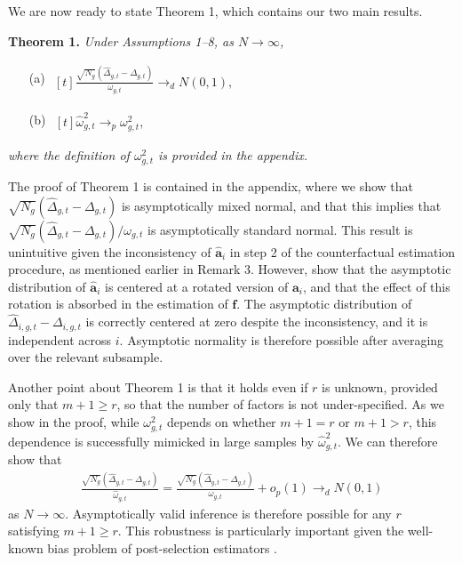 \documentclass[12pt,fleqn]{article}
\def\*#1{\mathbf{#1}}
\begin{document}
We are now ready to state Theorem 1, which contains our two main results.

\noindent \textbf{Theorem 1.} \emph{Under Assumptions 1--8, as $N\to\infty$,}
\begin{itemize}
  \item[(a) ] $\begin{aligned}[t]
    \frac{\sqrt{N_g}(\widehat \Delta_{g,t} - \Delta_{g,t})}{\omega_{g,t}} \to_d N(0, 1 ),
    \end{aligned}$

  \item[(b) ] $\begin{aligned}[t]
    \widehat \omega_{g,t}^2 \to_p \omega_{g,t}^2,
    \end{aligned}$
\end{itemize}
\emph{where the definition of $\omega_{g,t}^2$ is provided in the appendix.}

\bigskip

The proof of Theorem 1 is contained in the appendix, where we show that $\sqrt{N_g}(\widehat \Delta_{g,t} - \Delta_{g,t})$ is asymptotically mixed normal, and that this implies that $\sqrt{N_g}(\widehat \Delta_{g,t} - \Delta_{g,t})/\omega_{g,t}$ is asymptotically standard normal. This result is unintuitive given the inconsistency of $\widehat{\*a}_i$ in step 2 of the counterfactual estimation procedure, as mentioned earlier in Remark 3. However, \citet{brown2022generalized} show that the asymptotic distribution of $\widehat{\*a}_i$ is centered at a rotated version of $\*a_i$, and that the effect of this rotation is absorbed in the estimation of $\*f$. The asymptotic distribution of $\widehat \Delta_{i,g,t} - \Delta_{i,g,t}$ is correctly centered at zero despite the inconsistency, and it is independent across $i$. Asymptotic normality is therefore possible after averaging over the relevant subsample.

Another point about Theorem 1 is that it holds even if $r$ is unknown, provided only that $m+1 \geq r$, so that the number of factors is not under-specified. As we show in the proof, while $\omega_{g,t}^2$ depends on whether $m+1 = r$ or $m+1 > r$, this dependence is successfully mimicked in large samples by $\widehat \omega_{g,t}^2$. We can therefore show that
\begin{align}
\frac{\sqrt{N_g}(\widehat \Delta_{g,t} - \Delta_{g,t})}{\widehat \omega_{g,t}} = \frac{\sqrt{N_g}(\widehat \Delta_{g,t} - \Delta_{g,t})}{\omega_{g,t}} + o_p(1) \to_d N(0, 1 )
\end{align}
as $N\to\infty$. Asymptotically valid inference is therefore possible for any $r$ satisfying $m+1 \geq r$. This robustness is particularly important given the well-known bias problem of post-selection estimators \citep{leeb2005model}.
\end{document}
